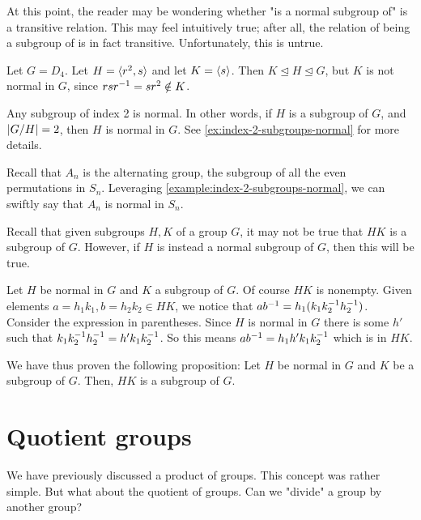 \documentclass[./main.tex]{subfiles}
\begin{document}
At this point, the reader may be wondering whether "is a normal subgroup of" is
a transitive relation. This may feel intuitively true; after all, the relation
of being a subgroup of is in fact transitive. Unfortunately, this is untrue.

\begin{example}
    Let $G = D_4$. Let $H = { \langle r^2, s \rangle }$ and let $K = { \langle s \rangle }$. Then $K \unlhd
    H \unlhd G$, but $K$ is not normal in $G$, since $rsr^{-1} = sr^2 \notin K$.
\end{example}

\begin{example}
\label{example:index-2-subgroups-normal}
    Any subgroup of index 2 is normal. In other words, if $H$ is a subgroup of
    $G$, and $\abs{G/H} = 2$, then $H$ is normal in $G$. See
    \cref{ex:index-2-subgroups-normal} for more details.
\end{example}

\begin{example}
    Recall that $A_n$ is the alternating group, the subgroup of all the even
    permutations in $S_n$. Leveraging \cref{example:index-2-subgroups-normal},
    we can swiftly say that $A_n$ is normal in $S_n$. 
\end{example}

Recall that given subgroups $H, K$ of a group $G$, it may not be true that $HK$
is a subgroup of $G$. However, if $H$ is instead a normal subgroup of $G$, then
this will be true.

\begin{example}
\label{example:product-of-subgroup-with-normal-subgroup}
    Let $H$ be normal in $G$ and $K$ a subgroup of $G$. Of course $HK$ is
    nonempty. Given elements $a = h_1k_1, b = h_2k_2 \in HK$, we notice that
    $ab^{-1} = h_1 (k_1 k_2 ^{-1} h_2 ^{-1})$. Consider the expression in
    parentheses. Since $H$ is normal in $G$ there is some $h'$ such that $k_1
    k_2^{-1} h_2^{-1} = h' k_1 k_2^{-1}$. So this means $ab^{-1} = h_1 h' k_1
    k_2^{-1}$ which is in $HK$.

    We have thus proven the following proposition: Let $H$ be normal in $G$ and
    $K$ be a subgroup of $G$. Then, $HK$ is a subgroup of $G$.
\end{example}


\section{Quotient groups}
We have previously discussed a product of groups. This concept was rather
simple. But what about the quotient of groups. Can we "divide" a group by
another group? 
\end{document}
